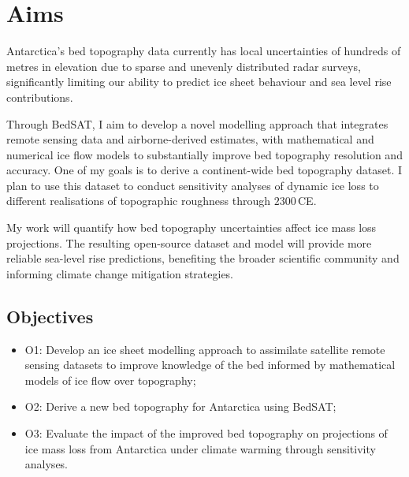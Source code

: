 \chapter{Aims}
Antarctica's bed topography data currently has local uncertainties of hundreds of metres in elevation due to sparse and unevenly distributed radar surveys, significantly limiting our ability to predict ice sheet behaviour and sea level rise contributions. 

Through BedSAT, I aim to develop a novel modelling approach that integrates remote sensing data and airborne-derived estimates, with mathematical and numerical ice flow models to substantially improve bed topography resolution and accuracy. One of my goals is to derive a continent-wide bed topography dataset. I plan to use this dataset to conduct sensitivity analyses of dynamic ice loss to different realisations of topographic roughness through $2300\!\,$CE.

My work will quantify how bed topography uncertainties affect ice mass loss projections. The resulting open-source dataset and model will provide more reliable sea-level rise predictions, benefiting the broader scientific community and informing climate change mitigation strategies.

\section{Objectives}
\begin{itemize}
    \item{O1:} Develop an ice sheet modelling approach to assimilate satellite remote sensing datasets to improve knowledge of the bed informed by mathematical models of ice flow over topography;
    \item{O2:} Derive a new bed topography for Antarctica using BedSAT;
    \item{O3:} Evaluate the impact of the improved bed topography on projections of ice mass loss from Antarctica under climate warming through sensitivity analyses. 
\end{itemize}